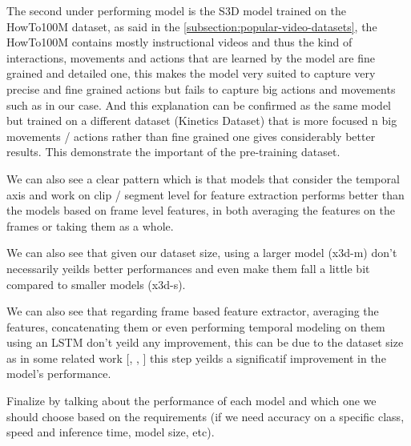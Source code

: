 The second under performing model is the S3D model trained on the HowTo100M dataset, as said in the \ref{subsection:popular-video-datasets}, the HowTo100M contains mostly instructional videos and thus the kind of interactions, movements and actions that are learned by the model are fine grained and detailed one, this makes the model very suited to capture very precise and fine grained actions but fails to capture big actions and movements such as in our case.
And this explanation can be confirmed as the same model but trained on a different dataset (Kinetics Dataset) that is more focused n big movements / actions rather than fine grained one gives considerably better results.
This demonstrate the important of the pre-training dataset.

We can also see a clear pattern which is that models that consider the temporal axis and work on clip / segment level for feature extraction performs better than the models based on frame level features, in both averaging the features on the frames or taking them as a whole.

We can also see that given our dataset size, using a larger model (x3d-m) don't necessarily yeilds better performances and even make them fall a little bit compared to smaller models (x3d-s).

We can also see that regarding frame based feature extractor, averaging the features, concatenating them or even performing temporal modeling on them using an LSTM don't yeild any improvement, this can be due to the dataset size as in some related work [\cite{example-paper-doing-temporal-modeling}, \cite{example-paper-doing-temporal-modeling}, \cite{example-paper-doing-temporal-modeling}] this step yeilds a significatif improvement in the model's performance.

Finalize by talking about the performance of each model and which one we should choose based on the requirements (if we need accuracy on a specific class, speed and inference time, model size, etc).

